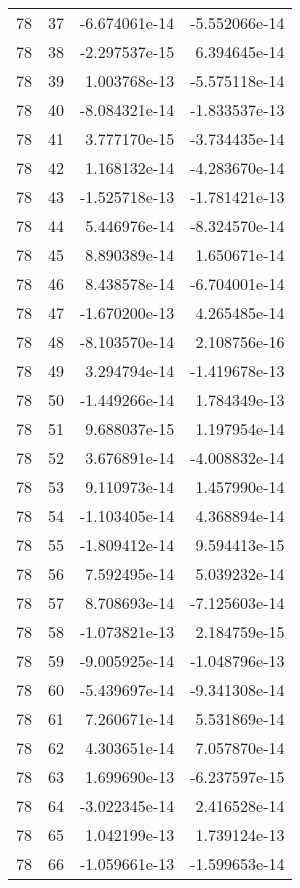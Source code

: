 \begin{tabular}{rrrr}
  78 &   37 & -6.674061e-14 & -5.552066e-14 \\
  78 &   38 & -2.297537e-15 &  6.394645e-14 \\
  78 &   39 &  1.003768e-13 & -5.575118e-14 \\
  78 &   40 & -8.084321e-14 & -1.833537e-13 \\
  78 &   41 &  3.777170e-15 & -3.734435e-14 \\
  78 &   42 &  1.168132e-14 & -4.283670e-14 \\
  78 &   43 & -1.525718e-13 & -1.781421e-13 \\
  78 &   44 &  5.446976e-14 & -8.324570e-14 \\
  78 &   45 &  8.890389e-14 &  1.650671e-14 \\
  78 &   46 &  8.438578e-14 & -6.704001e-14 \\
  78 &   47 & -1.670200e-13 &  4.265485e-14 \\
  78 &   48 & -8.103570e-14 &  2.108756e-16 \\
  78 &   49 &  3.294794e-14 & -1.419678e-13 \\
  78 &   50 & -1.449266e-14 &  1.784349e-13 \\
  78 &   51 &  9.688037e-15 &  1.197954e-14 \\
  78 &   52 &  3.676891e-14 & -4.008832e-14 \\
  78 &   53 &  9.110973e-14 &  1.457990e-14 \\
  78 &   54 & -1.103405e-14 &  4.368894e-14 \\
  78 &   55 & -1.809412e-14 &  9.594413e-15 \\
  78 &   56 &  7.592495e-14 &  5.039232e-14 \\
  78 &   57 &  8.708693e-14 & -7.125603e-14 \\
  78 &   58 & -1.073821e-13 &  2.184759e-15 \\
  78 &   59 & -9.005925e-14 & -1.048796e-13 \\
  78 &   60 & -5.439697e-14 & -9.341308e-14 \\
  78 &   61 &  7.260671e-14 &  5.531869e-14 \\
  78 &   62 &  4.303651e-14 &  7.057870e-14 \\
  78 &   63 &  1.699690e-13 & -6.237597e-15 \\
  78 &   64 & -3.022345e-14 &  2.416528e-14 \\
  78 &   65 &  1.042199e-13 &  1.739124e-13 \\
  78 &   66 & -1.059661e-13 & -1.599653e-14 \\

\end{tabular}
